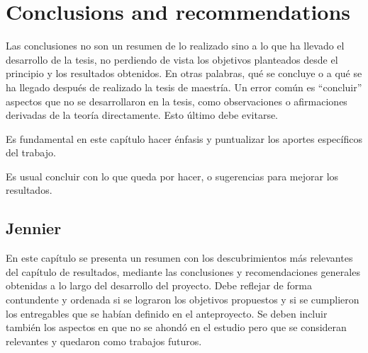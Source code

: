 \chapter{Conclusions and recommendations}

Las conclusiones no son un resumen de lo realizado sino a lo que ha llevado el
desarrollo de la tesis, no perdiendo de vista los objetivos planteados desde
el principio y los resultados obtenidos.  En otras palabras, qué se concluye o
a qué se ha llegado después de realizado la tesis de maestría.  Un error
común es ``concluir'' aspectos que no se desarrollaron en la tesis, como
observaciones o afirmaciones derivadas de la teoría directamente.  Esto último
debe evitarse.

Es fundamental en este capítulo hacer énfasis y puntualizar los
aportes específicos del trabajo.

Es usual concluir con lo que queda por hacer, o sugerencias para mejorar los
resultados.


\section{Jennier}

En este capítulo se presenta un resumen con los descubrimientos más
relevantes del capítulo de resultados, mediante las conclusiones y
recomendaciones generales obtenidas a lo largo del desarrollo del
proyecto.
Debe reflejar de forma contundente y ordenada si se lograron los objetivos
propuestos y si se cumplieron los entregables que se habían definido en el
anteproyecto. Se deben incluir también los aspectos en que no se ahondó
en el estudio pero que se consideran relevantes y quedaron como trabajos
futuros.

